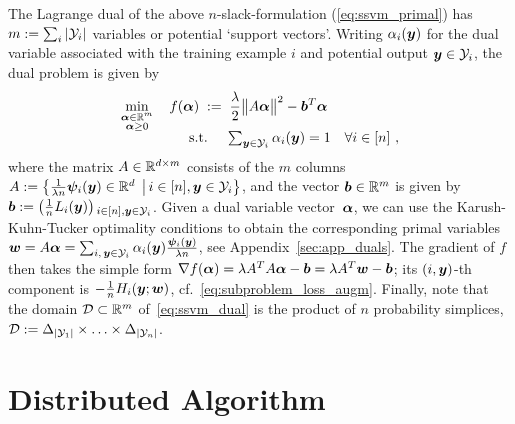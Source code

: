 The Lagrange dual of the above $n$-slack-formulation (\ref{eq:ssvm_primal}) has $m := \sum_i |\mathcal{Y}_i|$ variables or potential `support vectors'.
Writing $\alpha_i(\bm{y})$ for the dual variable associated with the training example $i$ and potential output $\bm{y} \in \mathcal{Y}_i$, the dual problem is given by
\begin{align}
    \label{eq:ssvm_dual} %
    \min_{\substack{ \dualvarv\in\R^{m} \\  \dualvarv \geq 0}} \quad  f(\dualvarv) \;:=&  \;\;
    \frac{\lambda}{2}
    \big\| A\dualvarv \big\|^2
    - \bv^T\dualvarv
    \\[-2mm]
    \text{s.t.} \quad &  \;
      \textstyle\sum_{\outputvarv \in \outputdomain_i}  \dualvar_i(\outputvarv) = 1 ~~~\forall i\in[n] \ , \notag 
\end{align}
where the matrix $A\in\mathbb{R}^{d\times m}$ consists of the $m$ columns $A := \SetOf{\frac1{\lambda n} \featuremapdiffv_i(\outputvarv) \in\R^d}{i\in[n],\outputvarv \in \outputdomain_i}$, and the vector $\bm{b} \in \mathbb{R}^m$ is given by 
$\bm{b}:= \left(\frac1n L_i(\bm{y}) \right)$$_{i\in[n],\bm{y}\in\mathcal{Y}_i}$. %
Given a dual variable vector~$\bm{\alpha}$, we can use the Karush-Kuhn-Tucker optimality conditions  to obtain the corresponding primal variables~$
{\bm{w}} = A\bm{\alpha}  = \sum_{i,\,\bm{y} \in \mathcal{Y}_i} \alpha_i(\bm{y})  \frac{\bm{\psi}_i(\bm{y})}{\lambda n}
$, see Appendix~\ref{sec:app_duals}.
The gradient of $f$ then takes the simple form $\nabla f(\bm{\alpha}) = \lambda A^TA\bm{\alpha} - \bm{b} = \lambda A^T{\bm{w}} - \bm{b}$; its \mbox{$(i,\bm{y})$-th} component is $-\frac{1}{n} H_i(\bm{y}; {\bm{w}})$, cf.~\eqref{eq:subproblem_loss_augm}. 
Finally, note that the domain $\mathcal{D} \subset \mathbb{R}^m$ of~\eqref{eq:ssvm_dual} is the product of $n$ probability simplices, $\mathcal{D} := \Delta_{|\mathcal{Y}_1|}\times\mathellipsis\times\Delta_{|\mathcal{Y}_n|}$.


%
\section{Distributed Algorithm}


